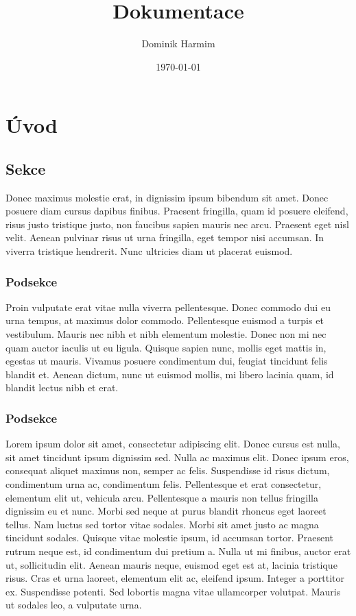 \documentclass{report}
\author{Dominik Harmim}
\title{Dokumentace}
\date{\today}
\begin{document}
	\maketitle
	\tableofcontents

	\chapter{Úvod}

	\section{Sekce}
	\label{odkaz1}
	Donec maximus molestie erat, in dignissim ipsum bibendum sit amet. 
	Donec posuere diam cursus dapibus finibus. Praesent fringilla, quam id 
	posuere eleifend, risus justo tristique justo, non faucibus sapien 
	mauris nec arcu. Praesent eget nisl velit. Aenean pulvinar risus ut 
	urna fringilla, eget tempor nisi accumsan. In viverra tristique 
	hendrerit. Nunc ultricies diam ut placerat euismod.

	\subsection{Podsekce}
	Proin vulputate erat vitae nulla viverra pellentesque. Donec commodo 
	dui eu urna tempus, at maximus dolor commodo. Pellentesque euismod a 
	turpis et vestibulum. Mauris nec nibh et nibh elementum molestie. Donec 
	non mi nec quam auctor iaculis ut eu ligula. Quisque sapien nunc, 
	mollis eget mattis in, egestas ut mauris. Vivamus posuere condimentum 
	dui, feugiat tincidunt felis blandit et.  Aenean dictum, nunc ut 
	euismod mollis, mi libero lacinia quam, id blandit lectus nibh et erat. 

	\subsection{Podsekce}
	Lorem ipsum dolor sit amet, consectetur adipiscing elit. Donec cursus 
	est nulla, sit amet tincidunt ipsum dignissim sed. Nulla ac maximus 
	elit. Donec ipsum eros, consequat aliquet maximus non, semper ac felis. 
	Suspendisse id risus dictum, condimentum urna ac, condimentum felis. 
	Pellentesque et erat consectetur, elementum elit ut, vehicula arcu. 
	Pellentesque a mauris non tellus fringilla dignissim eu et nunc. Morbi 
	sed neque at purus blandit rhoncus eget laoreet tellus. Nam luctus sed 
	tortor vitae sodales. Morbi sit amet justo ac magna tincidunt sodales. 
	Quisque vitae molestie ipsum, id accumsan tortor. Praesent rutrum neque 
	est, id condimentum dui pretium a. Nulla ut mi finibus, auctor erat ut, 
	sollicitudin elit. Aenean mauris neque, euismod eget est at, lacinia 
	tristique risus. Cras et urna laoreet, elementum elit ac, eleifend 
	ipsum.  Integer a porttitor ex. Suspendisse potenti. Sed lobortis magna 
	vitae ullamcorper volutpat. Mauris ut sodales leo, a vulputate urna.
\end{document}
